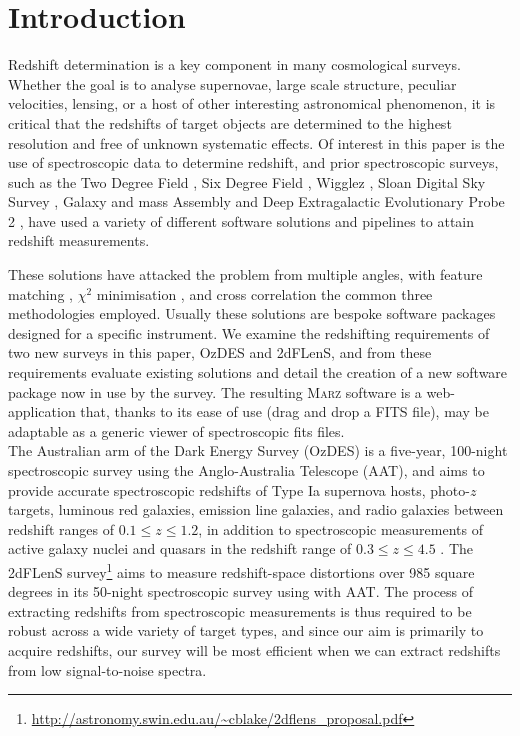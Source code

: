 \documentclass[5p]{elsarticle}
\newcommand{\marz}{\textsc{Marz}}
\begin{document}
\linenumbers


\section{Introduction}


Redshift determination is a key component in many cosmological surveys. Whether the goal is to analyse supernovae, large scale structure, peculiar velocities, lensing, or a host of other interesting astronomical phenomenon, it is critical that the redshifts of target objects are determined to the highest resolution and free of unknown systematic effects. Of interest in this paper is the use of spectroscopic data to determine redshift, and prior spectroscopic surveys, such as the Two Degree Field \citep[2dF,][]{LewisCannonTaylor2002}, Six Degree Field  \citep[6dF,][]{JonesSaundersColless2004},  Wigglez \citep{Drinkwater2010}, Sloan Digital Sky Survey \citep[SDSS,][]{SmeeGunnUomoto2013}, Galaxy and mass Assembly  \citep[GAMA,][]{HopkinsDriverBrough2013} and Deep Extragalactic Evolutionary Probe 2  \citep[DEEP2,][]{NewmanCooper2013}, have used a variety of different software solutions and pipelines to attain redshift measurements.


These solutions have attacked the problem from multiple angles, with feature matching \citep{colless2001, kurtz1998rvsao, GarilliFuana2010}, $\chi^2$ minimisation \citep{aihara2011eighth, BoltonSchlegel2012, GlazebrookOfferDeeley1998, NewmanCooper2013}, and cross correlation \citep{baldry2014galaxy, colless2001, GarilliFuana2010, kurtz1998rvsao, StoughtonLupton2002, TonryDavis1979} the common three methodologies employed. Usually these solutions are bespoke software packages designed for a specific instrument.  We examine the redshifting requirements of two new surveys in this paper, OzDES and 2dFLenS, and from these requirements evaluate existing solutions and detail the creation of a new software package now in use by the survey. The resulting \marz{} software is a web-application that, thanks to its ease of use (drag and drop a FITS file), may be adaptable as a generic viewer of spectroscopic fits files.\\


The Australian arm of the Dark Energy Survey (OzDES) is a five-year, 100-night spectroscopic survey using the Anglo-Australia Telescope (AAT), and aims to provide accurate spectroscopic redshifts of Type Ia supernova hosts, photo-$z$ targets, luminous red galaxies, emission line galaxies, and radio galaxies between redshift ranges of $0.1 \leq  z \leq 1.2$, in addition to spectroscopic measurements of active galaxy nuclei and quasars in the redshift range of $0.3 \leq z \leq 4.5$ \citep{fang2015}. The 2dFLenS survey\footnote{\url{http://astronomy.swin.edu.au/~cblake/2dflens_proposal.pdf}} aims to measure redshift-space distortions over 985 square degrees in its 50-night spectroscopic survey using with AAT.  The process of extracting redshifts from spectroscopic measurements is thus required to be robust across a wide variety of target types, and since our aim is primarily to acquire redshifts, our survey will be most efficient when we can extract redshifts from low signal-to-noise spectra.
\end{document}
